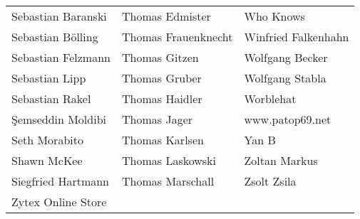 \begin{small}
\begin{tabular}{p{4cm}p{4cm}p{4cm}}
Sebastian Baranski & Thomas Edmister & Who Knows \\
Sebastian Bölling & Thomas Frauenknecht & Winfried Falkenhahn \\
Sebastian Felzmann & Thomas Gitzen & Wolfgang Becker \\
Sebastian Lipp & Thomas Gruber & Wolfgang Stabla \\
Sebastian Rakel & Thomas Haidler & Worblehat \\
Şemseddin Moldibi & Thomas Jager & www.patop69.net \\
Seth Morabito & Thomas Karlsen & Yan B \\
Shawn McKee & Thomas Laskowski & Zoltan Markus \\
Siegfried Hartmann & Thomas Marschall & Zsolt Zsila \\
Zytex Online Store &  &  \\
\end{tabular}
\end{small}
\ifdefined\printmanual
\else
{}
\fi
